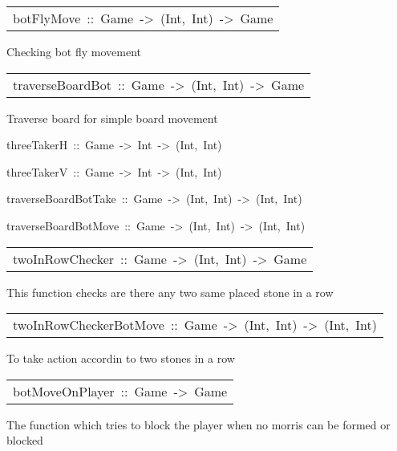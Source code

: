 \begin{haddockdesc}
\item[\begin{tabular}{@{}l}
botFlyMove\ ::\ Game\ ->\ (Int,\ Int)\ ->\ Game
\end{tabular}]\haddockbegindoc
{}
 Checking bot fly movement\par

\end{haddockdesc}
\begin{haddockdesc}
\item[\begin{tabular}{@{}l}
traverseBoardBot\ ::\ Game\ ->\ (Int,\ Int)\ ->\ Game
\end{tabular}]\haddockbegindoc
{}
 Traverse board for simple board movement\par

\end{haddockdesc}
\begin{haddockdesc}
\item[
threeTakerH\ ::\ Game\ ->\ Int\ ->\ (Int,\ Int)
]
\item[
threeTakerV\ ::\ Game\ ->\ Int\ ->\ (Int,\ Int)
]
\item[
traverseBoardBotTake\ ::\ Game\ ->\ (Int,\ Int)\ ->\ (Int,\ Int)
]
\item[
traverseBoardBotMove\ ::\ Game\ ->\ (Int,\ Int)\ ->\ (Int,\ Int)
]
\end{haddockdesc}
\begin{haddockdesc}
\item[\begin{tabular}{@{}l}
twoInRowChecker\ ::\ Game\ ->\ (Int,\ Int)\ ->\ Game
\end{tabular}]\haddockbegindoc
{}
 This function checks are there any two same placed stone in a row\par

\end{haddockdesc}
\begin{haddockdesc}
\item[\begin{tabular}{@{}l}
twoInRowCheckerBotMove\ ::\ Game\ ->\ (Int,\ Int)\ ->\ (Int,\ Int)
\end{tabular}]\haddockbegindoc
{}
 To take action accordin to two stones in a row\par

\end{haddockdesc}
\begin{haddockdesc}
\item[\begin{tabular}{@{}l}
botMoveOnPlayer\ ::\ Game\ ->\ Game
\end{tabular}]\haddockbegindoc
{}
 The function which tries to block the player when no morris can be formed or blocked\par

\end{haddockdesc}